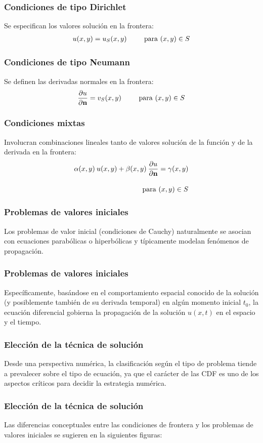 \documentclass[12pt]{beamer}
\begin{document}
\begin{frame}
\frametitle{Condiciones de tipo Dirichlet}
Se especifican los valores solución en la frontera:
\pause
\begin{align*}
u (x, y) = u_{S} (x, y) \hspace{0.75cm} \mbox{ para } (x, y) \in S
\end{align*}
\end{frame}
\begin{frame}
\frametitle{Condiciones de tipo Neumann}
Se definen las derivadas normales en la frontera:
\pause
\begin{align*}
\pdv{u}{\vb{n}} (x, y) = v_{S} (x, y) \hspace{0.75cm} \mbox{ para } (x, y) \in S
\end{align*}
\end{frame}
\begin{frame}
\frametitle{Condiciones mixtas}
Involucran combinaciones lineales tanto de valores solución de la función y de la derivada en la frontera:
\pause
\begin{align*}
\alpha (x, y) \: u (x, y) + \beta (x, y) \: \pdv{u}{\vb{n}} &= \gamma (x, y) \\[1em]
\mbox{ para } &(x, y) \in S
\end{align*}
\end{frame}
\begin{frame}
\frametitle{Problemas de valores iniciales}
Los problemas de valor inicial (condiciones de Cauchy) naturalmente se asocian con ecuaciones parabólicas o hiperbólicas y típicamente modelan fenómenos de propagación.
\end{frame}
\begin{frame}
\frametitle{Problemas de valores iniciales}
Específicamente, basándose en el comportamiento espacial conocido de la solución (y posiblemente también de su derivada temporal) en algún momento inicial $t_{0}$, la ecuación diferencial gobierna la propagación de la solución $u (x, t)$ en el espacio y el tiempo.
\end{frame}
\begin{frame}
\frametitle{Elección de la técnica de solución}
Desde una perspectiva numérica, la clasificación según el tipo de problema tiende a prevalecer sobre el tipo de ecuación, ya que el carácter de las CDF es uno de los aspectos críticos para decidir la estrategia numérica.
\end{frame}
\begin{frame}
\frametitle{Elección de la técnica de solución}
Las diferencias conceptuales entre las condiciones de frontera y los problemas de valores iniciales se sugieren en la siguientes figuras:
\end{frame}
\end{document}
